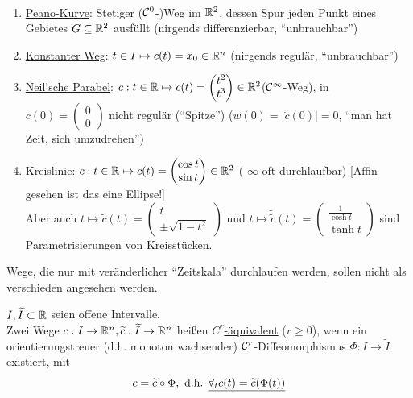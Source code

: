 \begin{bsp}\(\)
\begin{enumerate}
 \item \uline{Peano-Kurve}: Stetiger (\(\mathcal{C}^0\)-)Weg im \(\mathbb{R}^2\), dessen Spur jeden Punkt eines Gebietes \(G\subseteq \mathbb{R}^2\) ausfüllt (nirgends differenzierbar, "`unbrauchbar"')
 \item \uline{Konstanter Weg}: \(t \in I \mapsto c(t)=x_0 \in \mathbb{R}^n\) (nirgends regulär, "`unbrauchbar"')
 \item \uline{Neil'sche Parabel}: \(c: t\in \mathbb{R} \mapsto c(t) = \begin{pmatrix}
                                                                t^2 \\
								t^3
                                                               \end{pmatrix}
								\in \mathbb{R}^2 \)\quad (\(\mathcal{C}^\infty\)-Weg), in \(c(0)=\begin{pmatrix}
								                                                  0 \\
														  0
								                                                 \end{pmatrix} \) nicht regulär ("`Spitze"') (\(w(0)=|\dot c (0)|=0\), "`man hat Zeit, sich umzudrehen"')
 \item \uline{Kreislinie}: \(c: t\in \mathbb{R} \mapsto c(t)=\begin{pmatrix}
                                                       \cos t \\
						       \sin t
                                                      \end{pmatrix} \in \mathbb{R}^2\) ( \(\infty\)-oft durchlaufbar) [Affin gesehen ist das eine Ellipse!] \\
Aber auch \(t \mapsto \widetilde c(t) = \begin{pmatrix}
                                     t \\
				     \pm \sqrt{1-t^2}
                                    \end{pmatrix} \) und \(t \mapsto \widetilde{\widetilde c}(t)=\begin{pmatrix}
											  \frac{1}{\cosh t} \\
											  \tanh t
											 \end{pmatrix} \)
sind Parametrisierungen von Kreisstücken.
\end{enumerate}
\end{bsp}
Wege,  die nur mit veränderlicher "`Zeitskala"' durchlaufen werden, sollen nicht als verschieden angesehen werden.
\begin{definition}
 \(I, \widetilde I \subset \mathbb{R}\) seien offene Intervalle. \\
Zwei Wege \(c: I \to \mathbb{R}^n, \widetilde c: \widetilde I \to \mathbb{R}^n\) heißen \uline{\(C^r\)-äquivalent} (\(r\ge 0 \)), wenn ein orientierungstreuer (d.h. monoton wachsender) \(\mathcal{C}^r\)-Diffeomorphismus \(\Phi : I \to \widetilde I\) existiert, mit
\[
 \uline{c= \widetilde c \circ \Phi}, \text{ d.h. } \uline{\forall_t c(t)=\widetilde c (\Phi(t))}
\]

\end{definition}

